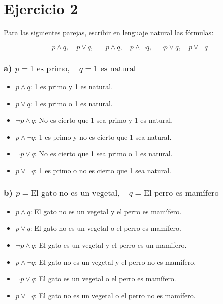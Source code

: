 \chapter*{Ejercicio 2}

Para las siguientes parejas, escribir en lenguaje natural las fórmulas:

\[
p \land q, \quad p \lor q,\quad \neg p \land q, \quad p \land \neg q, \quad \neg p \lor q, \quad p \lor \neg q
\]

\subsection*{a) $p = 1 \text{ es primo}, \quad q = 1 \text{ es natural}$}

\begin{itemize}
    \item $p \land q$: 1 es primo y 1 es natural.
    \item $p \lor q$: 1 es primo o 1 es natural.
    \item $\neg p \land q$: No es cierto que 1 sea primo y 1 es natural.
    \item $p \land \neg q$: 1 es primo y no es cierto que 1 sea natural.
    \item $\neg p \lor q$: No es cierto que 1 sea primo o 1 es natural.
    \item $p \lor \neg q$: 1 es primo o no es cierto que 1 sea natural.
\end{itemize}

\subsection*{b) $p = \text{El gato no es un vegetal}, \quad q = \text{El perro es mamífero}$}

\begin{itemize}
    \item $p \land q$: El gato no es un vegetal y el perro es mamífero.
    \item $p \lor q$: El gato no es un vegetal o el perro es mamífero.
    \item $\neg p \land q$: El gato es un vegetal y el perro es un mamifero.
    \item $p \land \neg q$: El gato no es un vegetal y el perro no es mamífero.
    \item $\neg p \lor q$: El gato es un vegetal o el perro es mamífero.
    \item $p \lor \neg q$: El gato no es un vegetal o el perro no es mamífero.
\end{itemize}

